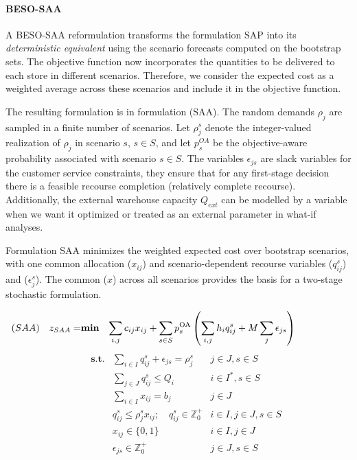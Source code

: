 \documentclass[mnsc,sglanonrev]{informs4}  %
\theoremstyle{remark}\newtheorem{remark}{Remark}
\begin{document}
\paragraph{BESO-SAA}

A BESO-SAA reformulation transforms the formulation SAP into its {\it deterministic equivalent} \citep{D55} using the scenario forecasts computed on the bootstrap sets.
The objective function now incorporates the quantities to be delivered to each store in different scenarios. Therefore, we consider the expected cost as a weighted average across these scenarios and include it in the objective function. 

The resulting formulation is in formulation (SAA). The random demands $\rho_j$ are sampled in a finite number of scenarios. Let $\rho^s_j$ denote the integer-valued realization of $\rho_j$ in scenario $s$, $s \in S$, and let $p^{OA}_s$ be the objective-aware probability associated with scenario $s \in S$. The variables $\epsilon_{js}$ are slack variables for the customer service constraints, they ensure that for any first-stage decision there is a feasible recourse completion (relatively complete recourse). Additionally, the external warehouse capacity $Q_{ext}$ can be modelled by a variable when we want it optimized or treated as an external parameter in what-if analyses.

Formulation SAA minimizes the weighted expected cost over bootstrap scenarios, with one common allocation ($x_{ij}$) and scenario-dependent recourse variables ($q^s_{ij}$) and ($\epsilon^s_j$). The common ($x$) across all scenarios provides the basis for a two-stage stochastic formulation. 

\begin{align}
	(SAA)\quad z_{SAA} = & \textbf{min} &\sum_{i,j}c_{ij}x_{ij} + \sum_{s\in S}p_s^{\mathrm{OA}} \left( \sum_{i,j}h_iq_{ij}^s+M\sum_j\epsilon_{js} \right) & \hspace{1.5cm} \label{DEobj}
\end{align}
\begin{align}
    & & \textbf{s.t.}
	& \sum_{i \in I} q_{ij}^s + \epsilon_{js} = \rho_j^s & j \in J, s \in S \label{DErequest}\\
	& &  & \sum_{j \in J}q_{ij}^s \leq Q_i & i \in I^*, s \in S \label{DEcapacity}\\ 
	& &  & \sum_{i \in I} x_{ij} = b_j & j \in J  \label{DEnumserv}\\
	& &  & q_{ij}^s \leq \rho_j^s x_{ij}; \quad q_{ij}^s \in \mathbb{Z}^+_0 & i \in I, j \in J, s \in S \label{DEcontin}\\
	& &  & x_{ij} \in \{0,1\} & i\in I, j \in J \label{DEx}\\
	& &  & \epsilon_{js} \in \mathbb{Z}^+_0 & j \in J, s \in S \label{DEeps}
\end{align}
\end{document}
